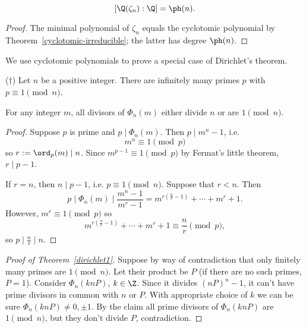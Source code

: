 \begin{thm}
\[
[\Q(\zeta_n):\Q]=\ph(n).
\]
\end{thm}
\begin{proof}
The minimal polynomial of $\zeta_n$ equals the cyclotomic polynomial by Theorem~\ref{cyclotomic-irreducible}; the latter has degree $\ph(n)$.
\end{proof}
We use cyclotomic polynomials to prove a special case of Dirichlet's theorem.
\begin{thm}($\dagger$)
Let $n$ be a positive integer. There are infinitely many primes $p$ with $p\equiv 1\pmod n$.
\end{thm}
\begin{lem}
For any integer $m$, all divisors of $\Phi_n(m)$ either divide $n$ or are $1\pmod n$.
\end{lem}
\begin{proof}
Suppose $p$ is prime and $p\mid \Phi_n(m)$. Then $p\mid m^n-1$, i.e.
\[
m^n\equiv 1\pmod p
\]
so $r:=\ord_p(m)\mid n$. Since $m^{p-1}\equiv 1\pmod p$ by Fermat's little theorem, $r\mid  p-1$.

If $r=n$, then $n\mid p-1$, i.e. $p\equiv 1\pmod n$.
Suppose that $r<n$. Then
\[
p\mid \Phi_n(m)\mid \frac{m^n-1}{m^r-1}=m^{r(\frac nr-1)}+\cdots +m^r+1.
\]
However, $m^r\equiv 1\pmod p$ so
\[
m^{r(\frac nr-1)}+\cdots +m^r+1\equiv \frac nr\pmod p,
\]
so $p\mid \frac{n}{r}\mid n$.
\end{proof}
\begin{proof}[Proof of Theorem~\ref{dirichlet1}]
Suppose by way of contradiction that only finitely many primes are $1\pmod n$. Let their product be $P$ (if there are no such primes, $P=1$). Consider $\Phi_n(knP)$, $k\in \Z$. Since it divides $(nP)^n-1$, it can't have prime divisors in common with $n$ or $P$. With appropriate choice of $k$ we can be sure $\Phi_n(knP)\ne 0,\pm1$. By the claim all prime divisors of $\Phi_n(knP)$ are $1\pmod n$, but they don't divide $P$, contradiction.
\end{proof}
%


